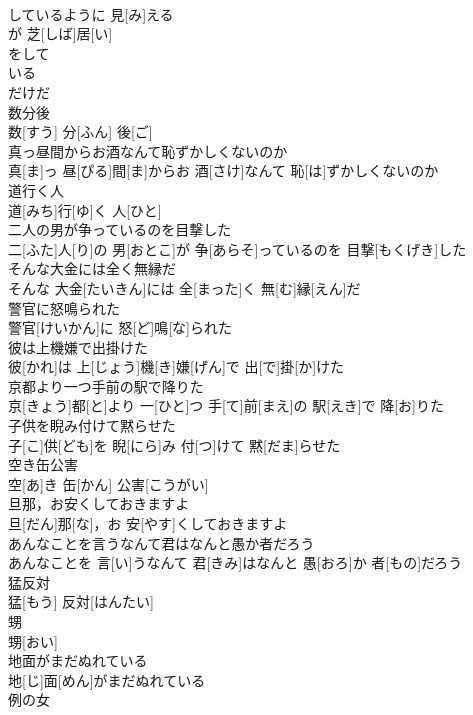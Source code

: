 \documentclass[8pt]{extreport}
\begin{document}
\begin{CJK}{UTF8}{min}
\\	しているように 見[み]える 
\\	が 芝[しば]居[い]
\\	をして 
\\	いる 
\\	だけだ
\\	数分後	
\\	数[すう] 分[ふん] 後[ご]
\\	真っ昼間からお酒なんて恥ずかしくないのか	
\\	真[ま]っ 昼[ぴる]間[ま]からお 酒[さけ]なんて 恥[は]ずかしくないのか
\\	道行く人	
\\	道[みち]行[ゆ]く 人[ひと]
\\	二人の男が争っているのを目撃した	
\\	二[ふた]人[り]の 男[おとこ]が 争[あらそ]っているのを 目撃[もくげき]した
\\	そんな大金には全く無縁だ	
\\	そんな 大金[たいきん]には 全[まった]く 無[む]縁[えん]だ
\\	警官に怒鳴られた	
\\	警官[けいかん]に 怒[ど]鳴[な]られた
\\	彼は上機嫌で出掛けた	
\\	彼[かれ]は 上[じょう]機[き]嫌[げん]で 出[で]掛[か]けた
\\	京都より一つ手前の駅で降りた	
\\	京[きょう]都[と]より 一[ひと]つ 手[て]前[まえ]の 駅[えき]で 降[お]りた
\\	子供を睨み付けて黙らせた	
\\	子[こ]供[ども]を 睨[にら]み 付[つ]けて 黙[だま]らせた
\\	空き缶公害	
\\	空[あ]き 缶[かん] 公害[こうがい]
\\	旦那，お安くしておきますよ	
\\	旦[だん]那[な]，お 安[やす]くしておきますよ
\\	あんなことを言うなんて君はなんと愚か者だろう	
\\	あんなことを 言[い]うなんて 君[きみ]はなんと 愚[おろ]か 者[もの]だろう
\\	猛反対	
\\	猛[もう] 反対[はんたい]
\\	甥	
\\	甥[おい]
\\	地面がまだぬれている	
\\	地[じ]面[めん]がまだぬれている
\\	例の女	

\end{CJK}
\end{document}

